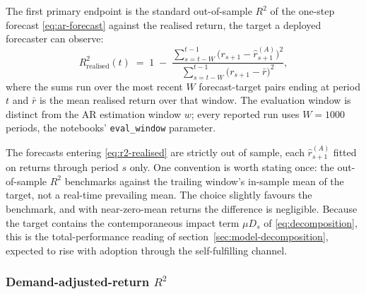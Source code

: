 \documentclass[12pt]{article}
\begin{document}
The first primary endpoint is the standard out-of-sample $R^{2}$ of the one-step forecast \eqref{eq:ar-forecast} against the realised return, the target a deployed forecaster can observe:
\begin{equation}
  R^{2}_{\mathrm{realised}}(t) \;=\; 1 \;-\; \frac{\sum_{s=t-W}^{t-1} \bigl(r_{s+1} - \hat{r}^{(A)}_{s+1}\bigr)^{2}}{\sum_{s=t-W}^{t-1} \bigl(r_{s+1} - \bar{r}\bigr)^{2}},
  \label{eq:r2-realised}
\end{equation}
where the sums run over the most recent $W$ forecast-target pairs ending at period $t$ and $\bar{r}$ is the mean realised return over that window. %
The evaluation window is distinct from the AR estimation window $w$; every reported run uses $W = 1000$ periods, the notebooks' \texttt{eval\_window} parameter. %

The forecasts entering \eqref{eq:r2-realised} are strictly out of sample, each $\hat{r}^{(A)}_{s+1}$ fitted on returns through period $s$ only. One convention is worth stating once: the out-of-sample $R^{2}$ benchmarks against the trailing window's in-sample mean of the target, not a real-time prevailing mean. The choice slightly favours the benchmark, and with near-zero-mean returns the difference is negligible. %
Because the target contains the contemporaneous impact term $\mu D_s$ of \eqref{eq:decomposition}, this is the total-performance reading of section~\ref{sec:model-decomposition}, expected to rise with adoption through the self-fulfilling channel. %

\subsubsection{Demand-adjusted-return $R^{2}$}
\end{document}
